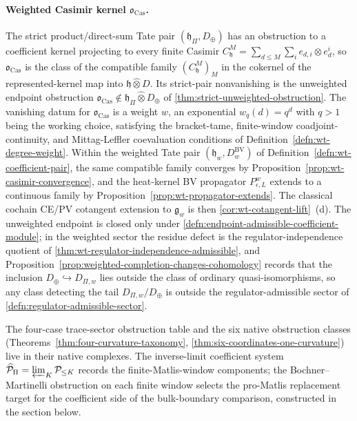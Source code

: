 \documentclass[11pt]{memoir}
\begin{document}
\paragraph{\texorpdfstring{Weighted Casimir kernel \(\mathfrak o_{\mathrm{Cas}}\).}{Weighted Casimir kernel o-Cas.}}
The strict product/direct-sum Tate pair
\((\mathfrak h_{\Pi},D_{\oplus})\) has an obstruction to a coefficient kernel
projecting to every finite Casimir
\(C^M_{\mathfrak h}=\sum_{d\leq M}\sum_i e_{d,i}\otimes e^i_d\), so
\(\mathfrak o_{\mathrm{Cas}}\) is the class of the compatible family
\((C^M_{\mathfrak h})_M\) in the cokernel of the represented-kernel map
into \(\mathfrak h\widehat\otimes D\).  Its strict-pair nonvanishing is
the unweighted endpoint obstruction
\(\mathfrak o_{\mathrm{Cas}}\notin\mathfrak h_{\Pi}\widehat\otimes
D_{\oplus}\) of \ref{thm:strict-unweighted-obstruction}.  The vanishing
datum for \(\mathfrak o_{\mathrm{Cas}}\) is a
weight \(w\), an exponential \(w_q(d)=q^d\) with \(q>1\) being the working
choice, satisfying the bracket-tame, finite-window coadjoint-continuity,
and Mittag-Leffler coevaluation conditions of
Definition~\ref{defn:wt-degree-weight}.  Within the weighted Tate pair
\((\mathfrak h_w,D^{\mathrm{BV}}_w)\) of
Definition~\ref{defn:wt-coefficient-pair}, the same compatible family
converges by Proposition~\ref{prop:wt-casimir-convergence}, and the
heat-kernel BV propagator \(P^w_{\epsilon,L}\) extends to a continuous
family by Proposition~\ref{prop:wt-propagator-extends}.  The classical
cochain CE/PV cotangent extension to \(\mathfrak g_w\) is then
\ref{cor:wt-cotangent-lift}~(d).  The unweighted endpoint is closed only
under \ref{defn:endpoint-admissible-coefficient-module}; in the weighted
sector the residue defect is the regulator-independence quotient of
\ref{thm:wt-regulator-independence-admissible}, and
Proposition~\ref{prop:weighted-completion-changes-cohomology} records that
the inclusion \(D_\oplus\hookrightarrow D_{\Pi,w}\) lies outside the class of
ordinary quasi-isomorphisms, so any class detecting the tail
\(D_{\Pi,w}/D_\oplus\) is outside the regulator-admissible sector of
\ref{defn:regulator-admissible-sector}.

The four-case trace-sector obstruction table and the six native
obstruction classes
(Theorems~\ref{thm:four-curvature-taxonomy},
\ref{thm:six-coordinates-one-curvature}) live in their native
complexes.  The inverse-limit coefficient system
\(\widehat{\mathcal P}_\Pi=\varprojlim_K\mathcal P_{\le K}\) records the
finite-Matlis-window components; the Bochner--Martinelli obstruction on
each finite window selects the pro-Matlis replacement target for the
coefficient side of the bulk-boundary comparison, constructed in the
section below.
\end{document}
